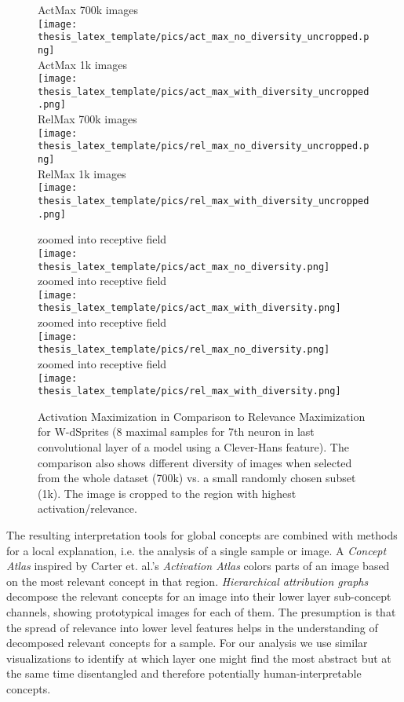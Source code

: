 \begin{figure}[t!]
\centering
\begin{minipage}{0.48\textwidth}
    ActMax 700k images \\
	\texttt{[image: thesis\_latex\_template/pics/act\_max\_no\_diversity\_uncropped.png]}\\
    ActMax 1k images \\
	\texttt{[image: thesis\_latex\_template/pics/act\_max\_with\_diversity\_uncropped.png]}\\
    RelMax 700k images\\
	\texttt{[image: thesis\_latex\_template/pics/rel\_max\_no\_diversity\_uncropped.png]}\\
    RelMax 1k images \\
	\texttt{[image: thesis\_latex\_template/pics/rel\_max\_with\_diversity\_uncropped.png]}
\end{minipage}
\begin{minipage}{0.48\textwidth}
    zoomed into receptive field \\
	\texttt{[image: thesis\_latex\_template/pics/act\_max\_no\_diversity.png]}\\
    zoomed into receptive field \\
	\texttt{[image: thesis\_latex\_template/pics/act\_max\_with\_diversity.png]}\\
    zoomed into receptive field \\
	\texttt{[image: thesis\_latex\_template/pics/rel\_max\_no\_diversity.png]}\\
    zoomed into receptive field \\
	\texttt{[image: thesis\_latex\_template/pics/rel\_max\_with\_diversity.png]}
\end{minipage}
\caption[ActMax vs. RelMax]{Activation Maximization in Comparison to Relevance Maximization for W-dSprites (8 maximal samples for 7th neuron in last convolutional layer of a model using a Clever-Hans feature). The comparison also shows different diversity of images when selected from the whole dataset (700k) vs. a small randomly chosen subset (1k). 
The image is cropped to the region with highest activation/relevance. }
\label{fig:act_rel_max}
\end{figure}

The resulting interpretation tools for global concepts are combined with methods for a local explanation, i.e. the analysis of a single sample or image. A \textit{Concept Atlas} inspired by Carter et. al.'s \textit{Activation Atlas} \cite{Carter2019} colors parts of an image based on the most relevant concept in that region. \textit{Hierarchical attribution graphs} decompose the relevant concepts for an image into their lower layer sub-concept channels, showing prototypical images for each of them. The presumption is that the spread of relevance into lower level features helps in the understanding of decomposed relevant concepts for a sample. For our analysis we use similar visualizations to identify at which layer one might find the most abstract but at the same time disentangled and therefore potentially human-interpretable concepts.\\

